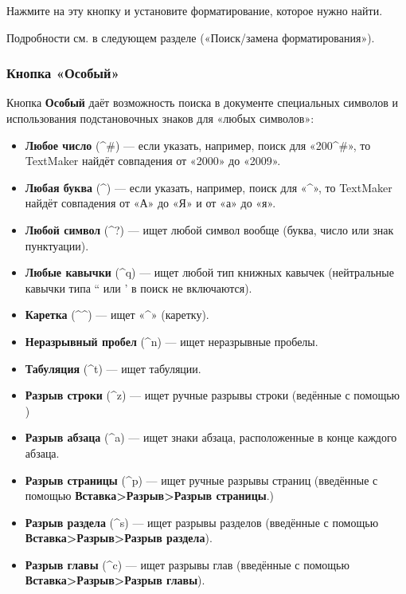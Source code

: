 \documentclass[a4paper,10pt]{article}
\begin{document}
Нажмите на эту кнопку и установите форматирование, которое нужно найти.

Подробности см. в следующем разделе («Поиск/замена форматирования»).

\subsubsection{Кнопка «Особый»}
Кнопка \textbf{Особый} даёт возможность поиска в документе специальных символов и использования подстановочных знаков для «любых символов»:
\begin{itemize}
 \item \textbf{Любое число} (\textasciicircum\#) --- если указать, например, поиск для «200\textasciicircum\#», то TextMaker найдёт совпадения от «2000» до «2009».
 \item \textbf{Любая буква} (\textasciicircum \textdollar) --- если указать, например, поиск для «\textasciicircum \textdollar», то TextMaker найдёт совпадения от «А» до «Я» и от «а» до «я».
 \item \textbf{Любой символ} (\textasciicircum?) --- ищет любой символ вообще (буква, число или знак пунктуации).
 \item \textbf{Любые кавычки} (\textasciicircum q) --- ищет любой тип книжных кавычек (нейтральные кавычки типа `` или ' в поиск не включаются).
 \item \textbf{Каретка} (\textasciicircum\textasciicircum) --- ищет «\textasciicircum» (каретку).
 \item \textbf{Неразрывный пробел} (\textasciicircum n) --- ищет неразрывные пробелы.
 \item \textbf{Табуляция} (\textasciicircum t) --- ищет табуляции.
 \item \textbf{Разрыв строки} (\textasciicircum z) --- ищет ручные разрывы строки (ведённые с помощью )
 \item \textbf{Разрыв абзаца} (\textasciicircum a) --- ищет знаки абзаца, расположенные в конце каждого абзаца.
 \item \textbf{Разрыв страницы} (\textasciicircum p) --- ищет ручные разрывы страниц (введённые с помощью \textbf{Вставка>Разрыв>Разрыв страницы}.)
 \item \textbf{Разрыв раздела} (\textasciicircum s) --- ищет разрывы разделов (введённые с помощью \textbf{Вставка>Разрыв>Разрыв раздела}).
 \item \textbf{Разрыв главы} (\textasciicircum c) --- ищет разрывы глав (введённые с помощью \textbf{Вставка>Разрыв>Разрыв главы}).
\end{itemize}
\end{document}
